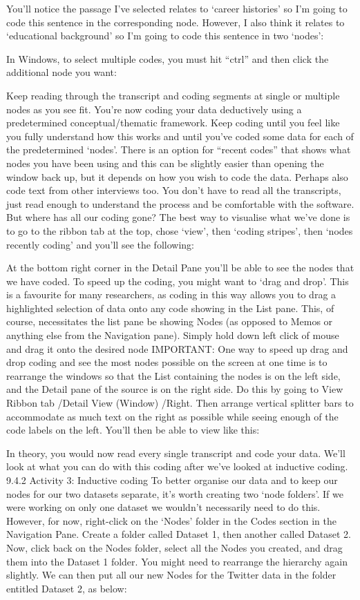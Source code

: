\documentclass[
]{book}
\begin{document}
You'll notice the passage I've selected relates to `career histories' so I'm going to code this sentence in the corresponding node. However, I also think it relates to `educational background' so I'm going to code this sentence in two `nodes':

In Windows, to select multiple codes, you must hit ``ctrl'' and then click the additional node you want:

Keep reading through the transcript and coding segments at single or multiple nodes as you see fit. You're now coding your data deductively using a predetermined conceptual/thematic framework.
Keep coding until you feel like you fully understand how this works and until you've coded some data for each of the predetermined `nodes'. There is an option for ``recent codes'' that shows what nodes you have been using and this can be slightly easier than opening the window back up, but it depends on how you wish to code the data. Perhaps also code text from other interviews too. You don't have to read all the transcripts, just read enough to understand the process and be comfortable with the software.
But where has all our coding gone? The best way to visualise what we've done is to go to the ribbon tab at the top, chose `view', then `coding stripes', then `nodes recently coding' and you'll see the following:

At the bottom right corner in the Detail Pane you'll be able to see the nodes that we have coded.
To speed up the coding, you might want to `drag and drop'. This is a favourite for many researchers, as coding in this way allows you to drag a highlighted selection of data onto any code showing in the List pane. This, of course, necessitates the list pane be showing Nodes (as opposed to Memos or anything else from the Navigation pane). Simply hold down left click of mouse and drag it onto the desired node
IMPORTANT: One way to speed up drag and drop coding and see the most nodes possible on the screen at one time is to rearrange the windows so that the List containing the nodes is on the left side, and the Detail pane of the source is on the right side. Do this by going to View Ribbon tab /Detail View (Window) /Right. Then arrange vertical splitter bars to accommodate as much text on the right as possible while seeing enough of the code labels on the left. You'll then be able to view like this:

In theory, you would now read every single transcript and code your data. We'll look at what you can do with this coding after we've looked at inductive coding.
9.4.2 Activity 3: Inductive coding
To better organise our data and to keep our nodes for our two datasets separate, it's worth creating two `node folders'. If we were working on only one dataset we wouldn't necessarily need to do this. However, for now, right-click on the `Nodes' folder in the Codes section in the Navigation Pane. Create a folder called Dataset 1, then another called Dataset 2. Now, click back on the Nodes folder, select all the Nodes you created, and drag them into the Dataset 1 folder. You might need to rearrange the hierarchy again slightly. We can then put all our new Nodes for the Twitter data in the folder entitled Dataset 2, as below:
\end{document}
